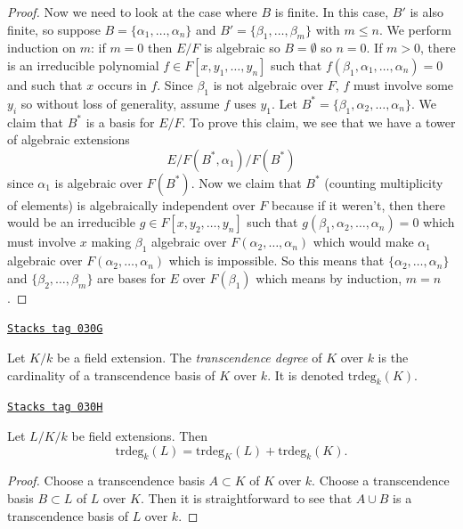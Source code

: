 \begin{proof}
\medskip\noindent
Now we need to look at the case where $B$ is finite.
In this case, $B'$ is also finite, so suppose
$B = \{\alpha_1, \ldots, \alpha_n\}$ and
$B' = \{\beta_1, \ldots, \beta_m\}$ with $m \leq n$.
We perform induction on $m$: if $m = 0$ then $E/F$ is algebraic so
$B = \emptyset$ so $n = 0$. If $m > 0$, there is an irreducible polynomial
$f \in F[x, y_1, \ldots, y_n]$ such that
$f(\beta_1, \alpha_1, \ldots, \alpha_n) = 0$ and such that $x$ occurs in $f$.
Since $\beta_1$ is not algebraic over $F$, $f$ must involve some $y_i$
so without loss of generality, assume $f$ uses $y_1$.
Let $B^* = \{\beta_1, \alpha_2, \ldots, \alpha_n\}$.
We claim that $B^*$ is a basis for $E/F$. To prove this claim, we see that
we have a tower of algebraic extensions
$$
E/ F(B^*, \alpha_1) / F(B^*)
$$
since $\alpha_1$ is algebraic over $F(B^*)$.
Now we claim that $B^*$ (counting multiplicity of elements) is
algebraically independent over $F$ because if it weren't, then there would be an
irreducible $g\in F[x, y_2, \ldots, y_n]$ such that
$g(\beta_1, \alpha_2, \ldots, \alpha_n) = 0$
which must involve $x$ making $\beta_1$
algebraic over $F(\alpha_2, \ldots, \alpha_n)$ which would make $\alpha_1$
algebraic over $F(\alpha_2, \ldots, \alpha_n)$ which is impossible.
So this means that $\{\alpha_2, \ldots, \alpha_n\}$ and
$\{\beta_2, \ldots, \beta_m\}$ are bases for $E$ over $F(\beta_1)$
which means by induction, $m = n$.
\end{proof}

\begin{definition}
\label{fields-definition-transcendence-degree}
\href{https://stacks.math.columbia.edu/tag/030G}{\texttt{Stacks tag 030G}}

Let $K/k$ be a field extension.
The {\it transcendence degree} of $K$ over $k$ is
the cardinality of a transcendence basis of $K$ over $k$.
It is denoted $\text{trdeg}_k(K)$.
\end{definition}

\begin{lemma}
\label{fields-lemma-transcendence-degree-tower}
\href{https://stacks.math.columbia.edu/tag/030H}{\texttt{Stacks tag 030H}}

Let $L/K/k$ be field extensions.
Then
$$
\text{trdeg}_k(L) =
\text{trdeg}_K(L) +
\text{trdeg}_k(K).
$$
\end{lemma}

\begin{proof}
Choose a transcendence basis $A \subset K$ of $K$ over $k$.
Choose a transcendence basis $B \subset L$ of $L$ over $K$.
Then it is straightforward to see that $A \cup B$ is a transcendence
basis of $L$ over $k$.
\end{proof}

